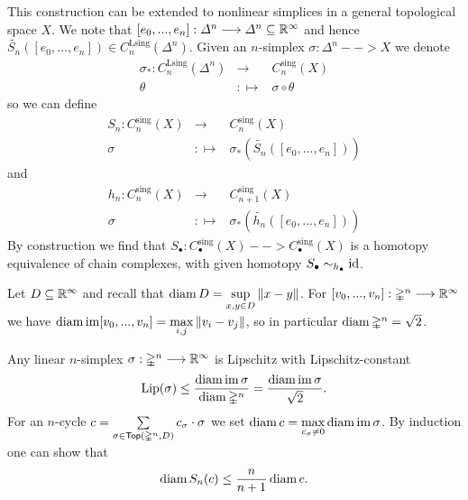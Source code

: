 \begin{sketch}
		This construction can be extended to nonlinear simplices in a general topological space $X$. We note that $[e_0,...,e_n]: \Delta^n --> \Delta^n \subseteq \mathbb{R}^\infty$ and hence $\widetilde{S_n}([e_0,...,e_n]) \in C_n^\text{Lsing}(\mathbb{\Delta}^n)$. Given an $n$-simplex $\sigma: \mathbb{\Delta}^n --> X$ we denote
		\begin{equation*}
			\begin{array}{rcl}
				\sigma_{*}: C_n^\text{Lsing}(\mathbb{\Delta}^n) & \longrightarrow & C_n^\text{sing}(X)\\
				\theta & :\longmapsto & \sigma \circ \theta
			\end{array}
		\end{equation*}
		so we can define
		\begin{equation*}
			\begin{array}{rcl}
				S_n: C_n^\text{sing}(X) & \longrightarrow & C_n^\text{sing}(X)\\
				\sigma & :\longmapsto & \sigma_{*}(\widetilde{S_n}([e_0,...,e_n]))
			\end{array}
		\end{equation*}
		and
		\begin{equation*}
			\begin{array}{rcl}
				h_n: C_n^\text{sing}(X) & \longrightarrow & C_{n+1}^\text{sing}(X)\\
				\sigma & :\longmapsto & \sigma_{*}(\widetilde{h_n}([e_0,...,e_n]))
			\end{array}
		\end{equation*}
		By construction we find that $S_\bullet: C_\bullet^\text{sing}(X) --> C_\bullet^\text{sing}(X)$ is a homotopy equivalence of chain complexes, with given homotopy $S_\bullet \sim_{h_\bullet} \operatorname{id}$.

		Let $D \subseteq \mathbb{R}^\infty$ and recall that $\operatorname{diam} D = \sup \limits_{x,y\in D} \Vert x-y \Vert$. For $[v_0,...,v_n]: \mathbb{\Delta}^n --> \mathbb{R}^\infty$ we have $\operatorname{diam} \operatorname{im} [v_0,...,v_n] = \max \limits_{i,j} \Vert v_i - v_j \Vert$, so in particular $\operatorname{diam} \mathbb{\Delta}^n = \sqrt{2}$.

		Any linear $n$-simplex $\sigma: \mathbb{\Delta}^n --> \mathbb{R}^\infty$ is Lipschitz with Lipschitz-constant
		\begin{equation*}
			\operatorname{Lip}(\sigma) \leq \dfrac{\operatorname{diam} \operatorname{im} \sigma}{\operatorname{diam} \mathbb{\Delta}^n} = \dfrac{\operatorname{diam} \operatorname{im} \sigma}{\sqrt{2}}.
		\end{equation*}
		For an $n$-cycle $c = \sum \limits_{\sigma \in \textsf{Top}(\mathbb{\Delta}^n,D)} c_\sigma \cdot \sigma$ we set $\operatorname{diam} c = \max \limits_{c_\sigma \neq 0} \operatorname{diam} \operatorname{im} \sigma$. By induction one can show that 
		\begin{equation*}
			\operatorname{diam} S_n(c) \leq \dfrac{n}{n+1}\operatorname{diam} c.
		\end{equation*}


\end{sketch}
